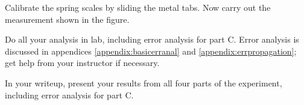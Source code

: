
Calibrate the spring scales by sliding the metal tabs.
Now carry out the measurement shown in the figure.

\selfcheck

Do all your analysis in lab, including error analysis for
part C.   Error analysis is discussed in appendices \ref{appendix:basicerranal}
and \ref{appendix:errpropagation}; get help from your instructor if necessary.

\analysis

In your writeup, present your results from all four parts of
the experiment, including error analysis for part C.
